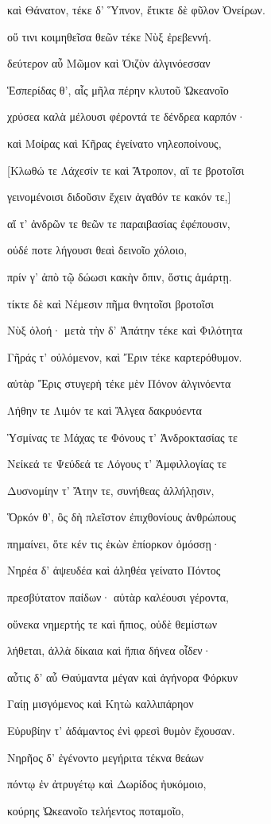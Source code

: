 \begin{pages}
\begin{Leftside}
καὶ Θάνατον, τέκε δ' Ὕπνον, ἔτικτε δὲ φῦλον Ὀνείρων. 

οὔ τινι κοιμηθεῖσα θεῶν τέκε Νὺξ ἐρεβεννή. 

δεύτερον αὖ Μῶμον καὶ Ὀιζὺν ἀλγινόεσσαν

Ἑσπερίδας θ', αἷς μῆλα πέρην κλυτοῦ Ὠκεανοῖο  

χρύσεα καλὰ μέλουσι φέροντά τε δένδρεα καρπόν·

καὶ Μοίρας καὶ Κῆρας ἐγείνατο νηλεοποίνους,

{[}Κλωθώ τε Λάχεσίν τε καὶ Ἄτροπον, αἵ τε βροτοῖσι 

γεινομένοισι διδοῦσιν ἔχειν ἀγαθόν τε κακόν τε,{]} 

αἵ τ' ἀνδρῶν τε θεῶν τε παραιβασίας ἐφέπουσιν,  

οὐδέ ποτε λήγουσι θεαὶ δεινοῖο χόλοιο,

πρίν γ' ἀπὸ τῷ δώωσι κακὴν ὄπιν, ὅστις ἁμάρτῃ.

τίκτε δὲ καὶ Νέμεσιν πῆμα θνητοῖσι βροτοῖσι 

Νὺξ ὀλοή· μετὰ τὴν δ' Ἀπάτην τέκε καὶ Φιλότητα 

Γῆράς τ' οὐλόμενον, καὶ Ἔριν τέκε καρτερόθυμον. 

αὐτὰρ Ἔρις στυγερὴ τέκε μὲν Πόνον ἀλγινόεντα

Λήθην τε Λιμόν τε καὶ Ἄλγεα δακρυόεντα

Ὑσμίνας τε Μάχας τε Φόνους τ' Ἀνδροκτασίας τε

Νείκεά τε Ψεύδεά τε Λόγους τ' Ἀμφιλλογίας τε 

Δυσνομίην τ' Ἄτην τε, συνήθεας ἀλλήλῃσιν, 

Ὅρκόν θ', ὃς δὴ πλεῖστον ἐπιχθονίους ἀνθρώπους

πημαίνει, ὅτε κέν τις ἑκὼν ἐπίορκον ὀμόσσῃ· 

Νηρέα δ' ἀψευδέα καὶ ἀληθέα γείνατο Πόντος 

πρεσβύτατον παίδων· αὐτὰρ καλέουσι γέροντα, 

οὕνεκα νημερτής τε καὶ ἤπιος, οὐδὲ θεμίστων 

λήθεται, ἀλλὰ δίκαια καὶ ἤπια δήνεα οἶδεν· 

αὖτις δ' αὖ Θαύμαντα μέγαν καὶ ἀγήνορα Φόρκυν

Γαίῃ μισγόμενος καὶ Κητὼ καλλιπάρηον 

Εὐρυβίην τ' ἀδάμαντος ἐνὶ φρεσὶ θυμὸν ἔχουσαν.

Νηρῆος δ' ἐγένοντο μεγήριτα τέκνα θεάων 

πόντῳ ἐν ἀτρυγέτῳ καὶ Δωρίδος ἠυκόμοιο,

κούρης Ὠκεανοῖο τελήεντος ποταμοῖο, 


\end{Leftside}
\end{pages}

